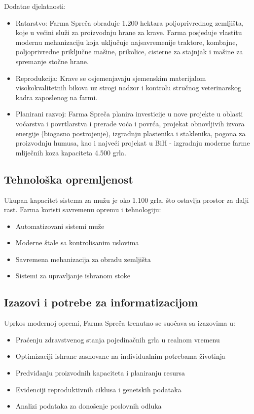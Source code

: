 \documentclass{article}
\begin{document}
Dodatne djelatnosti:
\begin{itemize}
    \item Ratarstvo: Farma Spreča obrađuje 1.200 hektara poljoprivrednog zemljišta, koje u većini služi za proizvodnju hrane za krave. Farma posjeduje vlastitu modernu mehanizaciju koja uključuje najsavremenije traktore, kombajne, poljoprivredne priključne mašine, prikolice, cisterne za stajnjak i mašine za spremanje stočne hrane.
    \item Reprodukcija: Krave se osjemenjavaju sjemenskim materijalom visokokvalitetnih bikova uz strogi nadzor i kontrolu stručnog veterinarskog kadra zaposlenog na farmi. 
    \item Planirani razvoj: Farma Spreča planira investicije u nove projekte u oblasti voćarstva i povrtlarstva i prerade voća i povrća, projekat obnovljivih izvora energije (biogasno postrojenje), izgradnju plastenika i staklenika, pogona za proizvodnju humusa, kao i najveći projekat u BiH - izgradnju moderne farme mliječnih koza kapaciteta 4.500 grla. 
\end{itemize}

\subsection{Tehnološka opremljenost}

Ukupan kapacitet sistema za mužu je oko 1.100 grla, što ostavlja prostor za dalji rast. Farma koristi savremenu opremu i tehnologiju:

\begin{itemize}
    \item Automatizovani sistemi muže
    \item Moderne štale sa kontrolisanim uslovima
    \item Savremena mehanizacija za obradu zemljišta
    \item Sistemi za upravljanje ishranom stoke
\end{itemize}

\subsection{Izazovi i potrebe za informatizacijom}

Uprkos modernoj opremi, Farma Spreča trenutno se suočava sa izazovima u:

\begin{itemize}
    \item Praćenju zdravstvenog stanja pojedinačnih grla u realnom vremenu
    \item Optimizaciji ishrane zasnovane na individualnim potrebama životinja
    \item Predviđanju proizvodnih kapaciteta i planiranju resursa
    \item Evidenciji reproduktivnih ciklusa i genetskih podataka
    \item Analizi podataka za donošenje poslovnih odluka
\end{itemize}
\end{document}
